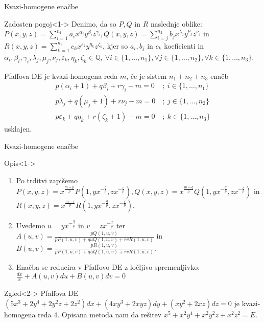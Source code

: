 \documentclass[t, 8pt]{beamer} %
\newcommand{\mth}[1]{\ensuremath{\mathbb{#1}}}
\newcommand{\Q}{\mth{Q}}
\newcommand{\fillblack}[1]{
	\begin{tikzpicture}[remember picture, overlay]
		\node [shift={(0 cm,0cm)}]  at (current page.south west)
		{%
			\begin{tikzpicture}[remember picture, overlay] at (current page.south west)
				\draw [fill=black] (0, 0) -- (0,#1 \paperheight) --
				(\paperwidth,#1 \paperheight) -- (\paperwidth,0) -- cycle ;
			\end{tikzpicture}
		};
		\draw (current page.north west) rectangle (current page.south east);
	\end{tikzpicture}
}
\begin{document}
		\begin{frame}{Kvazi-homogene enačbe}
			\begin{block}{Zadosten pogoj}<1->
				Denimo, da so $P, Q$ in $R$ naslednje oblike: 
					$P(x, y, z) = \sum_{i = 1}^{n_1}a_ix^{\alpha_i}y^{\beta_i}z^{\gamma_i},
					Q(x, y, z) = \sum_{i = j}^{n_2}b_jx^{\lambda_j}y^{\mu_j}z^{\nu_j}$ in
					$R(x, y, z) = \sum_{k = 1}^{n_3}c_kx^{\varepsilon_k}y^{\eta_k}z^{\zeta_k}$, kjer so $a_i, b_j$ in $c_k$ koeficienti in $\alpha_i, \beta_i, \gamma_i, \lambda_j, \mu_j, \nu_j, \varepsilon_k, \eta_k, \zeta_k\in \Q,~ \forall i\in \{1,\ldots, n_1\}, \forall j\in \{1,\ldots, n_2\}, \forall k\in \{1,\ldots, n_3\}$.
				
				Pfaffova DE je kvazi-homogena reda $m$, če je sistem $n_1 + n_2 + n_3$ enačb \begin{align*}
					p(\alpha_i+1) + q\beta_i + r\gamma_i - m = 0~&;~ i\in \{1, \ldots, n_1\} \\
					p\lambda_j + q(\mu_j+1) + r\nu_j - m= 0~&;~ j\in \{1, \ldots, n_2\} \\
					p\varepsilon_k + q\eta_k + r(\zeta_k+1) - m=0~&;~ k\in \{1, \ldots, n_3\}
				\end{align*} usklajen.
			\end{block}
		\end{frame}
		
		\begin{frame}{Kvazi-homogene enačbe}
			\begin{block}{Opis}<1->
				\begin{enumerate}
					\item Po trditvi zapišemo
						$P(x, y, z) = x^{\frac{m-p}{p}}P(1, yx^{-\frac{q}{p}}, zx^{-\frac{r}{p}}),
						Q(x, y, z) = x^{\frac{m-q}{p}}Q(1, yx^{-\frac{q}{p}}, zx^{-\frac{r}{p}})$ in
						$R(x, y, z) = x^{\frac{m-r}{p}}R(1, yx^{-\frac{q}{p}}, zx^{-\frac{r}{p}})$.
					\item Uvedemo $u = yx^{-\frac{q}{p}}$ in $v = zx^{-\frac{r}{p}}$ ter $A(u, v) = \frac{pQ(1, u, v)}{pP(1, u, v) + quQ(1, u, v) + rvR(1, u, v)}$ in $B(u, v) = \frac{pR(1, u, v)}{pP(1, u, v) + quQ(1, u, v) + rvR(1, u, v)}$.
					\item Enačba se reducira v Pfaffovo DE z ločljivo spremenljivko: $\frac{dx}{x} + A(u, v)du + B(u, v)dv = 0$
				\end{enumerate}
			\end{block}
			
			\begin{block}{Zgled}<2->
				Pfaffova DE $(5x^3 + 2y^4 + 2y^2z + 2z^2)dx + (4xy^3 + 2xyz)dy + (xy^2 + 2xz)dz = 0$ je kvazi-homogena reda $4$. Opisana metoda nam da rešitev $x^5 + x^2y^4 + x^2y^2z + x^2z^2 = E$.
			\end{block}
		\end{frame}
		
\end{document}
